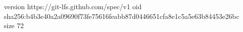 version https://git-lfs.github.com/spec/v1
oid sha256:b4b3e40a2a09690f73fe75616feabb87d0446651cfa8e1c5a5e63b84453e26bc
size 72
